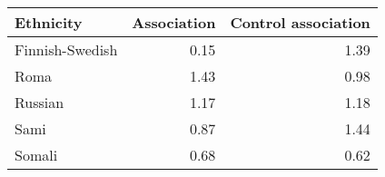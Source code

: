 \begin{tabular}{lrr}
\toprule
      Ethnicity &  Association &  Control association \\
\midrule
Finnish-Swedish &         0.15 &                 1.39 \\
           Roma &         1.43 &                 0.98 \\
        Russian &         1.17 &                 1.18 \\
           Sami &         0.87 &                 1.44 \\
         Somali &         0.68 &                 0.62 \\
\bottomrule
\end{tabular}
